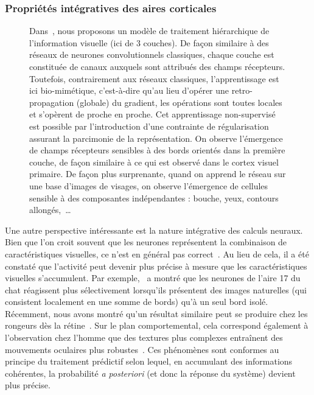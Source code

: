 \subsubsection{Propriétés intégratives des aires corticales}
\begin{figure}%
\caption{
Dans~\citep{BoutinFranciosiniChavaneRuffierPerrinet20}, nous proposons un
modèle de traitement hiérarchique de l'information visuelle (ici de 3 couches).
De façon similaire à des réseaux de neurones convolutionnels classiques,
chaque couche est constituée de canaux auxquels sont attribués des champs récepteurs.
Toutefois, contrairement aux réseaux classiques, l'apprentissage est ici bio-mimétique,
c'est-à-dire qu'au lieu d'opérer une retro-propagation (globale) du gradient,
les opérations sont toutes locales et s'opèrent de proche en proche.
Cet apprentissage non-supervisé est possible par l'introduction
d'une contrainte de régularisation assurant la parcimonie de la représentation.
On observe l'émergence de champs récepteurs sensibles à des bords orientés dans la première couche,
de façon similaire à ce qui est observé dans le cortex visuel primaire.
De façon plus surprenante, quand on apprend le réseau sur une base d'images de visages,
on observe l'émergence de cellules sensible à des composantes indépendantes : bouche, yeux, contours allongés,~\ldots
}
\label{fig:BoutinFranciosiniChavaneRuffierPerrinet19}
\end{figure}
Une autre perspective intéressante est la nature intégrative des calculs
neuraux. Bien que l'on croit souvent que les neurones représentent la
combinaison de caractéristiques visuelles, ce n'est en général pas
correct~\citep{Tring18}. Au lieu de cela, il a été constaté que
l'activité peut devenir plus précise à mesure que les caractéristiques
visuelles s'accumulent. Par exemple,~\citep{Baudot13} a montré que
les neurones de l'aire 17 du chat réagissent plus sélectivement
lorsqu'ils présentent des images naturelles (qui consistent localement
en une somme de bords) qu'à un seul bord isolé. Récemment,
nous avons montré qu'un résultat similaire peut se produire chez les rongeurs dès
la rétine~\citep{Ravello19}. Sur le plan comportemental, cela correspond
également à l'observation chez l'homme que des textures plus complexes
entraînent des mouvements oculaires plus robustes~\citep{Simoncini12}. Ces phénomènes sont conformes au principe du traitement prédictif
selon lequel, en accumulant des informations cohérentes, la probabilité
\emph{a posteriori} (et donc la réponse du système) devient plus
précise.

